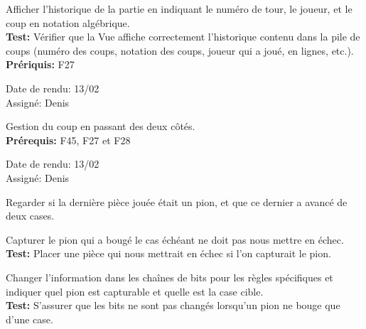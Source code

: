 \documentclass{article}
\begin{document}
\begin{needbox}
    Afficher l'historique de la partie en indiquant le numéro de tour, le joueur, et le coup en notation algébrique.\\
    \textbf{Test:} Vérifier que la Vue affiche correctement l'historique contenu dans la pile de coups (numéro des coups,
    notation des coups, joueur qui a joué, en lignes, etc.).\\
    \textbf{Prériquis:} F27
    \begin{duedatebox}
        Date de rendu: 13/02\\
        Assigné: Denis
    \end{duedatebox}
\end{needbox}

\begin{needbox}[F29: En passant ]
    Gestion du coup en passant des deux côtés.\\
    \textbf{Prérequis:} F45, F27 et F28
    \begin{duedatebox}
        Date de rendu: 13/02\\
        Assigné: Denis
    \end{duedatebox}
    \begin{subneedbox}
        Regarder si la dernière pièce jouée était un pion, et que ce dernier a avancé de deux cases.
    \end{subneedbox}
    \begin{subneedbox}
        Capturer le pion qui a bougé le cas échéant ne doit pas nous mettre en échec.\\
        \textbf{Test:} Placer une pièce qui nous mettrait en échec si l'on capturait le pion.
    \end{subneedbox}
    \begin{subneedbox}
        Changer l'information dans les chaînes de bits pour les règles spécifiques et indiquer quel pion
        est capturable et quelle est la case cible.\\
        \textbf{Test:} S'assurer que les bits ne sont pas changés lorsqu'un pion ne bouge que d'une case.
    \end{subneedbox}
\end{needbox}
\end{document}
